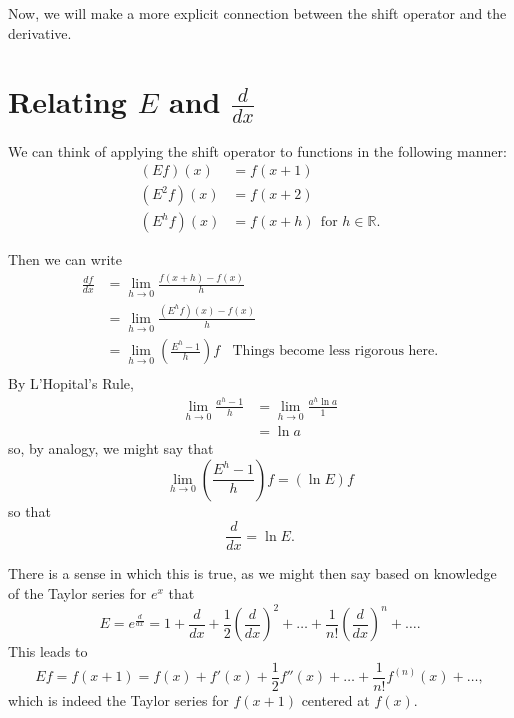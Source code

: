 \documentclass[11pt]{article}
\newcommand{\R}{\mathbb R} %
\begin{document}
Now, we will make a more explicit connection between the shift operator and the derivative.


\section{Relating $E$ and $\frac{d}{dx}$}

We can think of applying the shift operator to functions in the following manner:
$$
\begin{aligned}
(Ef)(x) &= f(x+1) \\
(E^2f)(x) &= f(x+2) \\
(E^hf)(x) &= f(x+h)~~\text{for $h \in \R$}.
\end{aligned}
$$

Then we can write
$$
\begin{aligned}
\frac{df}{dx} &= \lim_{h \rightarrow 0}{\frac{f(x+h)-f(x)}{h}} \\
              &= \lim_{h \rightarrow 0}{\frac{(E^hf)(x)-f(x)}{h}} \\
              &= \lim_{h \rightarrow 0}{\left(\frac{E^h-1}{h}\right)}f~~~~\text{Things become less rigorous here.} \\
\end{aligned}
$$
By L'Hopital's Rule,
$$
\begin{aligned}
\lim_{h \rightarrow 0}{\frac{a^h-1}{h}} &= \lim_{h \rightarrow 0}{\frac{a^h\ln{a}}{1}} \\
                                      &= \ln{a} 
\end{aligned}
$$
so, by analogy, we might say that
$$\lim_{h \rightarrow 0}{\left(\frac{E^h-1}{h}\right)}f = (\ln{E})f$$
so that
$$\frac{d}{dx} = \ln{E}.$$

There is a sense in which this is true, as we might then say based on knowledge of the Taylor series for $e^x$ that
$$E = e^{\frac{d}{dx}} = 1 + \frac{d}{dx} + \frac{1}{2}\left(\frac{d}{dx}\right)^2 + \ldots + \frac{1}{n!}\left(\frac{d}{dx}\right)^n + \ldots.$$
This leads to
$$Ef = f(x+1) = f(x) + f'(x) + \frac{1}{2}f''(x) + \ldots + \frac{1}{n!}f^{(n)}(x) + \ldots,$$
which is indeed the Taylor series for $f(x+1)$ centered at $f(x)$.
\end{document}
